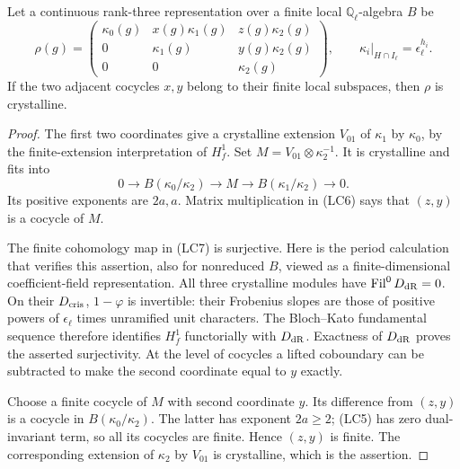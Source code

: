 \begin{srlemma}\label{lem:sr-triangular-adjacent-crystalline}
Let a continuous rank-three representation over a finite
local \(\mathbb Q_\ell\)-algebra \(B\) be
\[
 \rho(g)=
 \begin{pmatrix}
 \kappa_0(g)&x(g)\kappa_1(g)&z(g)\kappa_2(g)\\
 0&\kappa_1(g)&y(g)\kappa_2(g)\\
 0&0&\kappa_2(g)
 \end{pmatrix},
 \qquad
 \kappa_i|_{H\cap I_\ell}=\epsilon_\ell^{h_i}.
 \tag{LC6}
\]
If the two adjacent cocycles \(x,y\) belong to their finite
local subspaces, then \(\rho\) is crystalline.
\end{srlemma}
\begin{proof}
The first two coordinates give a crystalline extension
\(V_{01}\) of \(\kappa_1\) by \(\kappa_0\), by the
finite-extension interpretation of \(H^1_f\).
Set \(M=V_{01}\otimes\kappa_2^{-1}\).
It is crystalline and fits into
\[
 0\longrightarrow B(\kappa_0/\kappa_2)
       \longrightarrow M\longrightarrow B(\kappa_1/\kappa_2)
       \longrightarrow0 .
 \tag{LC7}
\]
Its positive exponents are \(2a,a\).
Matrix multiplication in (LC6) says that \((z,y)\) is
a cocycle of \(M\).

The finite cohomology map in (LC7) is surjective.
Here is the period calculation that verifies this assertion,
also for nonreduced \(B\), viewed as a finite-dimensional
coefficient-field representation.
All three crystalline modules have
\(\operatorname{Fil}^0D_{\rm dR}=0\).
On their \(D_{\rm cris}\), \(1-\varphi\) is invertible:
their Frobenius slopes are those of positive powers of
\(\epsilon_\ell\) times unramified unit characters.
The Bloch--Kato fundamental sequence therefore identifies
\(H^1_f\) functorially with \(D_{\rm dR}\).
Exactness of \(D_{\rm dR}\) proves the asserted surjectivity.
At the level of cocycles a lifted coboundary can be
subtracted to make the second coordinate equal to \(y\)
exactly.

Choose a finite cocycle of \(M\) with second coordinate \(y\).
Its difference from \((z,y)\) is a cocycle in
\(B(\kappa_0/\kappa_2)\).
The latter has exponent \(2a\ge2\); (LC5) has zero
dual-invariant term, so all its cocycles are finite.
Hence \((z,y)\) is finite.
The corresponding extension of \(\kappa_2\) by \(V_{01}\)
is crystalline, which is the assertion.
\end{proof}

